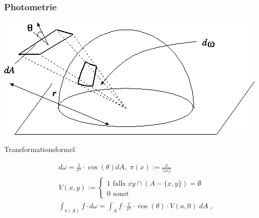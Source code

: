 \documentclass{beamer}
\begin{document}
\begin{frame}
    \frametitle{Photometrie}
\framesubtitle{}
\begin{center}
\includegraphics[scale=0.30]{images/solidangle}
\end{center}

\begin{block}{Transformationsformel}


\begin{align}
& d\omega =  \frac{1}{r^2} \cdot  \cos(\theta) dA, \;  \pi(x):=  \frac{x}{||x||}  \\
& V(x,y) := \begin{cases}
1 \text{ falls } \overline{xy} \cap (A -\{x,y\}) = \emptyset \\
0 \text{ sonst }
\end{cases} \\
& \int_{\pi(A)} f \cdot   d\omega  =  \int_{A} f  \cdot \frac{1}{r^2} \cdot  \cos(\theta) \cdot V(a, 0)  \; dA \; ,
\end{align}


\end{block}
\end{frame}
\end{document}

